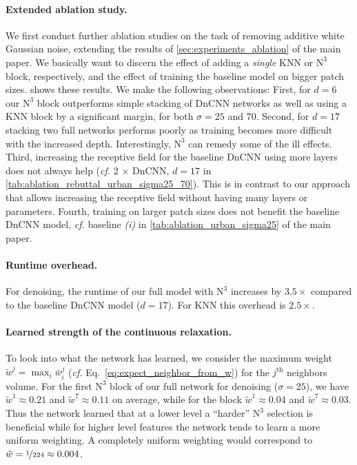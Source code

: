 \documentclass{article}
\makeatletter
\newcommand{\cf}{\emph{cf.}\@\xspace}
\newcommand\KNN{\text{KNN}}
\newcommand\mw{\bar{w}}
\newcommand\nnn{\text{N}^3}
\makeatother
\begin{document}
\paragraph{Extended ablation study.}
We first conduct further ablation studies on the task of removing additive white Gaussian noise, extending the results of \cref{sec:experiments_ablation} of the main paper. 
We basically want to discern the effect of adding a \emph{single} KNN or $\nnn$ block, respectively, and the effect of training the baseline model on bigger patch sizes. 
 shows these results.
We make the following observations:
First, for $d=6$ our $\nnn$ block outperforms simple stacking of DnCNN networks as well as using a $\KNN$ block by a significant margin, for both $\sigma=25$ and $70$.
Second, for $d=17$ stacking two full networks performs poorly as training becomes more difficult with the increased depth.
Interestingly, $\nnn$ can remedy some of the ill effects.
Third, increasing the receptive field for the baseline DnCNN using more layers does not always help (\cf 2 $\times$ DnCNN, $d=17$ in \cref{tab:ablation_rebuttal_urban_sigma25_70}).
This is in contrast to our approach that allows increasing the receptive field without having many layers or parameters.
Fourth, training on larger patch sizes does not benefit the baseline DnCNN model, \cf baseline \emph{(i)} in \cref{tab:ablation_urban_sigma25} of the main paper.

\paragraph{Runtime overhead.}
For denoising, the runtime of our full model with $\nnn$ increases by $3.5\times$ compared to the baseline DnCNN model ($d=17$).
For KNN this overhead is $2.5\times$.

\paragraph{Learned strength of the continuous relaxation.}
To look into what the network has learned, we consider the maximum weight $\tilde{w}^j = \max_i \mw_i^j$ (\cf Eq.~\ref{eq:expect_neighbor_from_w}) for the $j^\text{th}$ neighbors volume.
For the first $\nnn$ block of our full network for denoising ($\sigma=25$), we have $\tilde{w}^1 \approx 0.21$ and $\tilde{w}^7 \approx 0.11$ on average, while for the  block  $\tilde{w}^1 \approx 0.04$ and $\tilde{w}^7 \approx 0.03$.
Thus the network learned that at a lower level a ``harder'' $\nnn$ selection is beneficial while for higher level features the network tends to learn a more uniform weighting.
A completely uniform weighting would correspond to $\tilde{w}=\nicefrac{1}{224}\approx0.004$.
\end{document}
